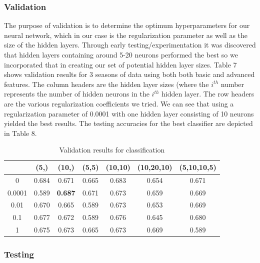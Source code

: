\documentclass{article}
\begin{document}
\subsubsection{Validation}
The purpose of validation is to determine the optimum hyperparameters for our neural network, which in our case is the regularization parameter as well as the size of the hidden layers. Through early testing/experimentation it was discovered that hidden layers containing around 5-20 neurons performed the best so we incorporated that in creating our set of potential hidden layer sizes. Table 7 shows validation results for 3 seasons of data using both both basic and advanced features. The column headers are the hidden layer sizes (where the $i^{th}$ number represents the number of hidden neurons in the $i^{th}$ hidden layer. The row headers are the various regularization coefficients we tried. We can see that using a regularization parameter of 0.0001 with one hidden layer consisting of 10 neurons yielded the best results. The testing accuracies for the best classifier are depicted in Table 8.

\begin{table}
  \begin{center}
    \begin{tabular}{ | c | c | c | c | c | c | c |}
      \hline
            &             	(5,) & 	(10,) & 	(5,5) &  	(10,10) & 	(10,20,10) & 	(5,10,10,5)  \\ \hline
	0  &     	0.684 & 	0.671&	0.665&	0.683&	0.654&		0.671	    \\ \hline
	0.0001 &   0.589 &     \textbf{0.687}&	0.671&	0.673&	0.659&		0.669	    \\ \hline
	0.01  &    	0.670 &     0.665&	0.589&	0.673&	0.653&		0.669	    \\ \hline
	0.1	&	0.677&	0.672&	0.589&	0.676&	0.645&		0.680	    \\ \hline
	1&		0.675&	0.673&	0.665&	0.673&	0.669&		0.589	    \\ \hline

    \end{tabular}
  \end{center}
  \caption{Validation results for classification}
\end{table}

\subsubsection{Testing}
\end{document}
